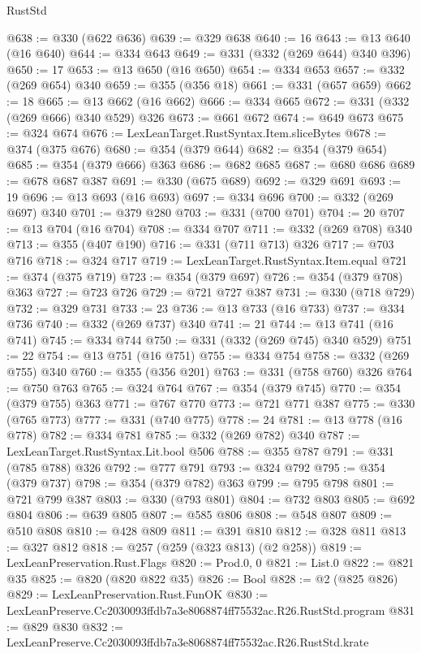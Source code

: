 \begin{lexlean}{RustStd}
\begin{coremodule}
@638 := @330 (@622 @636)
@639 := @329 @638
@640 := 16
@643 := @13 @640 (@16 @640)
@644 := @334 @643
@649 := @331 (@332 (@269 @644) @340 @396)
@650 := 17
@653 := @13 @650 (@16 @650)
@654 := @334 @653
@657 := @332 (@269 @654) @340
@659 := @355 (@356 @18)
@661 := @331 (@657 @659)
@662 := 18
@665 := @13 @662 (@16 @662)
@666 := @334 @665
@672 := @331 (@332 (@269 @666) @340 @529) @326
@673 := @661 @672
@674 := @649 @673
@675 := @324 @674
@676 := LexLeanTarget.RustSyntax.Item.sliceBytes
@678 := @374 (@375 @676)
@680 := @354 (@379 @644)
@682 := @354 (@379 @654)
@685 := @354 (@379 @666) @363
@686 := @682 @685
@687 := @680 @686
@689 := @678 @687 @387
@691 := @330 (@675 @689)
@692 := @329 @691
@693 := 19
@696 := @13 @693 (@16 @693)
@697 := @334 @696
@700 := @332 (@269 @697) @340
@701 := @379 @280
@703 := @331 (@700 @701)
@704 := 20
@707 := @13 @704 (@16 @704)
@708 := @334 @707
@711 := @332 (@269 @708) @340
@713 := @355 (@407 @190)
@716 := @331 (@711 @713) @326
@717 := @703 @716
@718 := @324 @717
@719 := LexLeanTarget.RustSyntax.Item.equal
@721 := @374 (@375 @719)
@723 := @354 (@379 @697)
@726 := @354 (@379 @708) @363
@727 := @723 @726
@729 := @721 @727 @387
@731 := @330 (@718 @729)
@732 := @329 @731
@733 := 23
@736 := @13 @733 (@16 @733)
@737 := @334 @736
@740 := @332 (@269 @737) @340
@741 := 21
@744 := @13 @741 (@16 @741)
@745 := @334 @744
@750 := @331 (@332 (@269 @745) @340 @529)
@751 := 22
@754 := @13 @751 (@16 @751)
@755 := @334 @754
@758 := @332 (@269 @755) @340
@760 := @355 (@356 @201)
@763 := @331 (@758 @760) @326
@764 := @750 @763
@765 := @324 @764
@767 := @354 (@379 @745)
@770 := @354 (@379 @755) @363
@771 := @767 @770
@773 := @721 @771 @387
@775 := @330 (@765 @773)
@777 := @331 (@740 @775)
@778 := 24
@781 := @13 @778 (@16 @778)
@782 := @334 @781
@785 := @332 (@269 @782) @340
@787 := LexLeanTarget.RustSyntax.Lit.bool @506
@788 := @355 @787
@791 := @331 (@785 @788) @326
@792 := @777 @791
@793 := @324 @792
@795 := @354 (@379 @737)
@798 := @354 (@379 @782) @363
@799 := @795 @798
@801 := @721 @799 @387
@803 := @330 (@793 @801)
@804 := @732 @803
@805 := @692 @804
@806 := @639 @805
@807 := @585 @806
@808 := @548 @807
@809 := @510 @808
@810 := @428 @809
@811 := @391 @810
@812 := @328 @811
@813 := @327 @812
@818 := @257 (@259 (@323 @813) (@2 @258))
@819 := LexLeanPreservation.Rust.Flags
@820 := Prod.{0, 0}
@821 := List.{0}
@822 := @821 @35
@825 := @820 (@820 @822 @35)
@826 := Bool
@828 := @2 (@825 @826)
@829 := LexLeanPreservation.Rust.FunOK
@830 := LexLeanPreserve.Cc2030093ffdb7a3e8068874ff75532ac.R26.RustStd.program
@831 := @829 @830
@832 := LexLeanPreserve.Cc2030093ffdb7a3e8068874ff75532ac.R26.RustStd.krate

\end{coremodule}
\end{lexlean}
